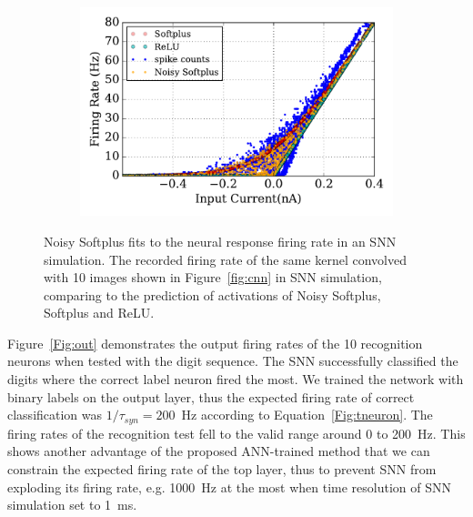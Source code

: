 			
	\begin{figure}[tbh!]
		\centering
		\begin{subfigure}[t]{0.9\textwidth}
			\includegraphics[width=\textwidth]{pics_iconip/6-5.pdf}
		\end{subfigure}
		\caption{
			Noisy Softplus fits to the neural response firing rate in an SNN simulation.
			The recorded firing rate of the same kernel convolved with 10 images shown in Figure~\ref{fig:cnn} in SNN simulation, comparing to the prediction of activations of Noisy Softplus, Softplus and ReLU.}
		\label{fig:af_compare}
	\end{figure}
	
	Figure~\ref{Fig:out} demonstrates the output firing rates of the 10 recognition neurons when tested with the digit sequence.
	The SNN successfully classified the digits where the correct label neuron fired the most.
	We trained the network with binary labels on the output layer, thus the expected firing rate of correct classification was $1/\tau_{syn}=200$~Hz according to Equation~\ref{Fig:tneuron}.
	The firing rates of the recognition test fell to the valid range around 0 to 200~Hz.
	This shows another advantage of the proposed ANN-trained method that we can constrain the expected firing rate of the top layer, thus to prevent SNN from exploding its firing rate, e.g. 1000~Hz at the most when time resolution of SNN simulation set to 1~ms.
	
